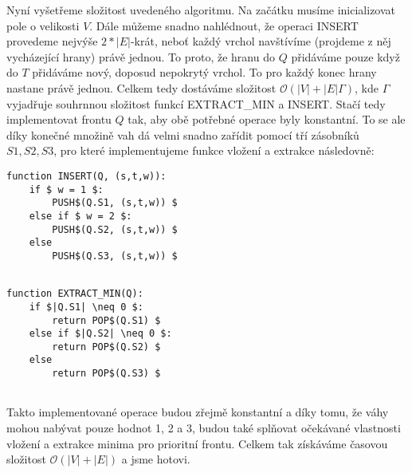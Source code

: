 \documentclass[12pt,a4paper]{article}
\theoremstyle{plain}
\begin{document}
Nyní vyšetřeme složitost uvedeného algoritmu. Na začátku musíme inicializovat pole o velikosti $ V $. Dále můžeme snadno nahlédnout, že operaci INSERT provedeme nejvýše $ 2 * |E| $-krát, neboť každý vrchol navštívíme (projdeme z něj vycházející hrany) právě jednou. To proto, že hranu do $ Q $ přidáváme pouze když do $ T $ přidáváme nový, doposud nepokrytý vrchol. To pro každý konec hrany nastane právě jednou. Celkem tedy dostáváme složitost $ \mathcal{O}(|V| + |E| \Gamma )$, kde $ \Gamma $ vyjadřuje souhrnnou složitost funkcí EXTRACT\_MIN a INSERT. Stačí tedy implementovat frontu $ Q $ tak, aby obě potřebné operace byly konstantní. To se ale díky konečné množině vah dá velmi snadno zařídit pomocí tří zásobníků $ S1, S2, S3 $, pro které implementujeme funkce vložení a extrakce následovně:

\begin{lstlisting}[mathescape]
function INSERT(Q, (s,t,w)):
    if $ w = 1 $:
        PUSH$(Q.S1, (s,t,w)) $
    else if $ w = 2 $:
        PUSH$(Q.S2, (s,t,w)) $
    else 
        PUSH$(Q.S3, (s,t,w)) $
     
\end{lstlisting}

\begin{lstlisting}[mathescape]
function EXTRACT_MIN(Q):
    if $|Q.S1| \neq 0 $:
        return POP$(Q.S1) $
    else if $|Q.S2| \neq 0 $:
        return POP$(Q.S2) $
    else 
        return POP$(Q.S3) $
     
\end{lstlisting}

Takto implementované operace budou zřejmě konstantní a díky tomu, že váhy mohou nabývat pouze hodnot 1, 2 a 3, budou také splňovat očekávané vlastnosti vložení a extrakce minima pro prioritní frontu. Celkem tak získáváme časovou složitost $ \mathcal{O}(|V| + |E|)$ a jsme hotovi.
\end{document}
